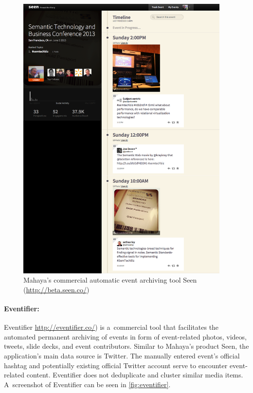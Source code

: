 \begin{figure}
  \centering
  \includegraphics[width=0.95\textwidth,height=0.9\textheight,keepaspectratio]{seen.png}
  \caption[Mahaya's commercial automatic event archiving tool Seen]{Mahaya's commercial automatic event archiving tool Seen
    (\url{http://beta.seen.co/})}
  \label{fig:seen}
\end{figure}

\paragraph{Eventifier:}

Eventifier \url{http://eventifier.co/}) is a~commercial tool
that facilitates the automated permanent archiving of events
in form of event-related photos, videos, tweets, slide decks, 
and event contributors.
Similar to Mahaya's product Seen,
the application's main data source is Twitter.
The manually entered event's official hashtag and potentially existing
official Twitter account serve to encounter event-related content.
Eventifier does not deduplicate and cluster
similar media items.
A~screenshot of Eventifier can be seen in \autoref{fig:eventifier}.

